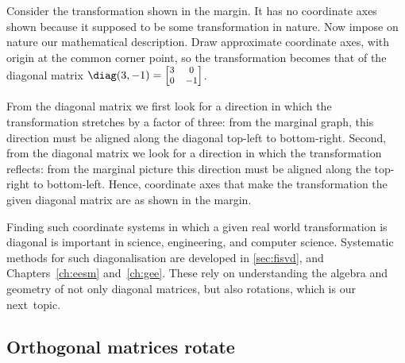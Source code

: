 \begin{example} \label{eg:}
Consider the transformation shown in the margin.
%
It has no coordinate axes shown because it supposed to be some transformation in nature. 
Now impose on nature our mathematical description.
Draw approximate coordinate axes, with origin at the common corner point, so the transformation becomes that of the diagonal matrix \(\diag(3,-1)=\footnotesize\begin{bmatrix} 3&0\\0&-1 \end{bmatrix}\).

\begin{solution} 
From the diagonal matrix we first look for a direction in which the transformation stretches by a factor of three: 
%
from the marginal graph, this direction must be aligned along the diagonal top-left to bottom-right.
Second, from the diagonal matrix we look for a direction in which the transformation reflects: from the marginal picture this direction must be aligned along the top-right to bottom-left.
Hence, coordinate axes that make the transformation the given diagonal matrix are as shown in the margin. 
\end{solution}
\end{example}


Finding such coordinate systems in which a given real world transformation is diagonal is important in science, engineering, and computer science.
Systematic methods for such diagonalisation are developed in \autoref{sec:fisvd}, and Chapters~\ref{ch:eesm} and~\ref{ch:gee}.
These rely on understanding the algebra and geometry of not only diagonal matrices, but also rotations, which is our next~topic.













\subsection{Orthogonal matrices rotate}
\label{sec:omr}


